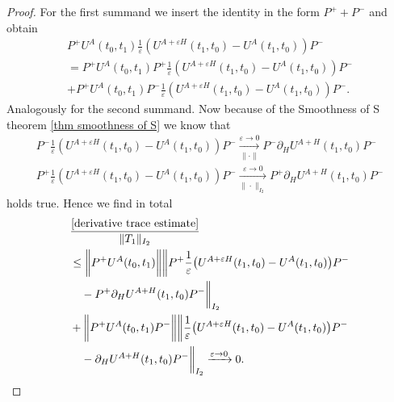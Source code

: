 \documentclass[b5paper,draft,openbib,12pt]{memoir}
\begin{document}
\begin{proof}
For the first summand we insert the identity in the 
form \(P^++P^-\) and obtain
\begin{align}
P^+ U^{A}(t_0,t_1) 
  \frac{1}{\varepsilon}\left(U^{A+\varepsilon H}(t_1,t_0)-U^{A}(t_1,t_0)\right)P^-\\
=P^+ U^{A}(t_0,t_1) P^+
\frac{1}{\varepsilon}\left(U^{A+\varepsilon H}(t_1,t_0)-U^{A}(t_1,t_0)\right)P^-\\
+P^+ U^{A}(t_0,t_1) P^-
\frac{1}{\varepsilon}\left(U^{A+\varepsilon H}(t_1,t_0)-U^{A}(t_1,t_0)\right)P^-.
\end{align}
Analogously for the second summand.
Now because of the Smoothness of S theorem 
\ref{thm smoothness of S}
we know that 
\begin{align}
  P^-
  \frac{1}{\varepsilon}\left(U^{A+\varepsilon H}(t_1,t_0)-U^{A}(t_1,t_0)\right)
  P^-\xrightarrow[\|\cdot\|]{\varepsilon\rightarrow 0} P^- \partial_H U^{A+H}(t_1,t_0)P^-\\
  P^+
  \frac{1}{\varepsilon}\left(U^{A+\varepsilon H}(t_1,t_0)-U^{A}(t_1,t_0)\right)
  P^-\xrightarrow[\|\cdot\|_{I_2}]{\varepsilon\rightarrow 0} P^+ \partial_H U^{A+H}(t_1,t_0)P^-
\end{align}
holds true. Hence we find in total 
\begin{align}
&\frac{\eqref{derivative trace estimate}}{\|T_1\|_{I_2}}\\
&\le \notag
\bigg\|  P^+ U^{A}(t_0,t_1)\bigg\| \bigg\| P^+
\frac{1}{\varepsilon}\big(U^{A+\varepsilon H}(t_1,t_0)-U^{A}(t_1,t_0)\big)P^- \\
&\quad- P^+\partial_{H}U^{A+H}(t_1,t_0)P^-\bigg\|_{I_2}\\
&+\bigg\|  P^+ U^{A}(t_0,t_1)P^- \bigg\| \bigg\|  \notag
\frac{1}{\varepsilon}\big(U^{A+\varepsilon H}(t_1,t_0)-U^{A}(t_1,t_0)\big)P^- \\
&\quad-\partial_{H}U^{A+H}(t_1,t_0)P^-\bigg\|_{I_2}\xrightarrow{\varepsilon \rightarrow 0} 0.
\end{align}

\end{proof}
\end{document}
